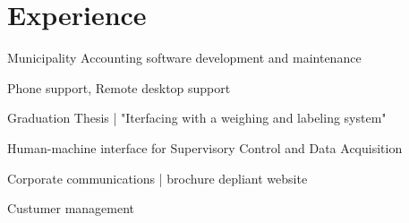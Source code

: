 \documentclass[letterpaper]{deedy-resume} %
\begin{document}
\begin{minipage}[t]{0.66\textwidth} %



\section{Experience}


\vspace{\topsep} %
\begin{tightitemize}
	\item Municipality Accounting software development and maintenance
	\item Phone support, Remote desktop support
\end{tightitemize}

\sectionspace %



\begin{tightitemize}
	\item Graduation Thesis | "Iterfacing with a weighing and labeling system"  
	\item Human-machine interface for Supervisory Control and Data Acquisition 
\end{tightitemize}

\sectionspace %



\begin{tightitemize}
	\item Corporate communications | brochure \textbullet{} depliant \textbullet{} website\item Custumer management
\end{tightitemize}


\end{minipage}
\end{document}
